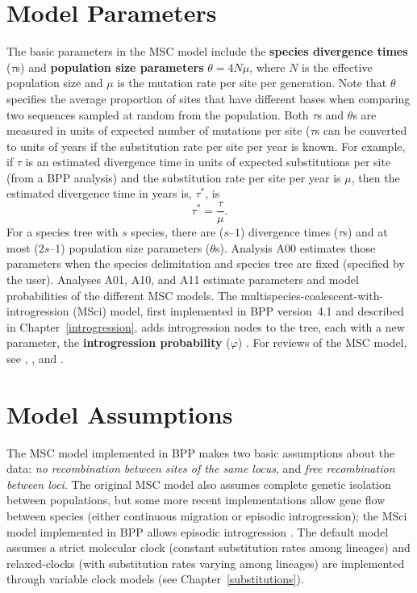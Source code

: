 \documentclass{book}
\numberwithin{equation}{section} \renewcommand{\baselinestretch}{0.55}
\begin{document}
\section{Model Parameters}
The basic parameters in the MSC model include the \textbf{species
  divergence times} ($\tau$s) and \textbf{population size parameters}
$\theta = 4N\mu$, where $N$ is the effective population size and $\mu$
is the mutation rate per site per generation. Note that $\theta$
specifies the average proportion of sites that have different bases when
comparing two sequences sampled at random from the population.  Both $\tau$s and
$\theta$s are measured in units of expected number of mutations per site
($\tau$s can be converted to units of years if the substitution rate
per site per year is known. For example, if $\tau$ is an estimated divergence
time in units of expected substitutions per site (from a BPP analysis)
and the substitution rate per site per year is $\mu$, then the estimated
divergence time in years is, $\tau^*$, is
\begin{displaymath}
\tau^* = \frac{\tau}{\mu}.
\end{displaymath}
For a species tree with $s$ species, there are ($s – 1$) divergence
times ($\tau$s) and at most ($2s – 1$) population size parameters
($\theta$s).  Analysis A00 estimates those parameters when the species
delimitation and species tree are fixed (specified by the user).
Analyses A01, A10, and A11 estimate parameters and model probabilities
of the different MSC models.  The
multispecies-coalescent-with-introgression (MSci) model, first
implemented in BPP version~4.1 and described in
Chapter~\ref{introgression}, adds introgression nodes to the tree,
each with a new parameter, the \textbf{introgression probability}
($\varphi$) \citep[see][]{Flouri2020a}.  For reviews of the MSC model,
see \citet[][Chapter 9]{Yang2014b}, \citet{Xu2016}, and
\citet{Rannala2020a}.

\section{Model Assumptions}
The MSC model implemented in BPP makes two basic assumptions about the
data: \emph{no recombination between sites of the same locus}, and
\emph{free recombination between loci}.  The original MSC model
\citep[][]{Rannala2003} also assumes complete genetic isolation
between populations, but some more recent implementations allow gene
flow between species (either continuous migration or episodic
introgression); the MSci model implemented in BPP allows episodic
introgression \citep[][]{Flouri2020a}.  The default model assumes a strict
molecular clock (constant substitution rates among lineages) and
relaxed-clocks (with substitution rates varying among lineages) are implemented through variable clock models (see
Chapter~\ref{substitutions}).
\end{document}
